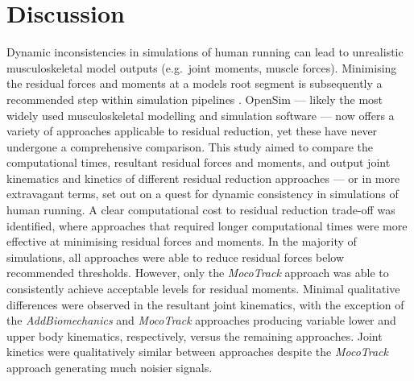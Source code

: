\documentclass[]{elsarticle} %
\begin{document}
\hypertarget{discussion}{%
\section{Discussion}\label{discussion}}

Dynamic inconsistencies in simulations of human running can lead to
unrealistic musculoskeletal model outputs (e.g.~joint moments, muscle
forces). Minimising the residual forces and moments at a models root
segment is subsequently a recommended step within simulation pipelines
\citep{Delp2007, Hicks2015}. OpenSim --- likely the most widely used
musculoskeletal modelling and simulation software --- now offers a
variety of approaches applicable to residual reduction, yet these have
never undergone a comprehensive comparison. This study aimed to compare
the computational times, resultant residual forces and moments, and
output joint kinematics and kinetics of different residual reduction
approaches --- or in more extravagant terms, set out on a quest for
dynamic consistency in simulations of human running. A clear
computational cost to residual reduction trade-off was identified, where
approaches that required longer computational times were more effective
at minimising residual forces and moments. In the majority of
simulations, all approaches were able to reduce residual forces below
recommended thresholds. However, only the \emph{MocoTrack} approach was
able to consistently achieve acceptable levels for residual moments.
Minimal qualitative differences were observed in the resultant joint
kinematics, with the exception of the \emph{AddBiomechanics} and
\emph{MocoTrack} approaches producing variable lower and upper body
kinematics, respectively, versus the remaining approaches. Joint
kinetics were qualitatively similar between approaches despite the
\emph{MocoTrack} approach generating much noisier signals.

~
\end{document}
